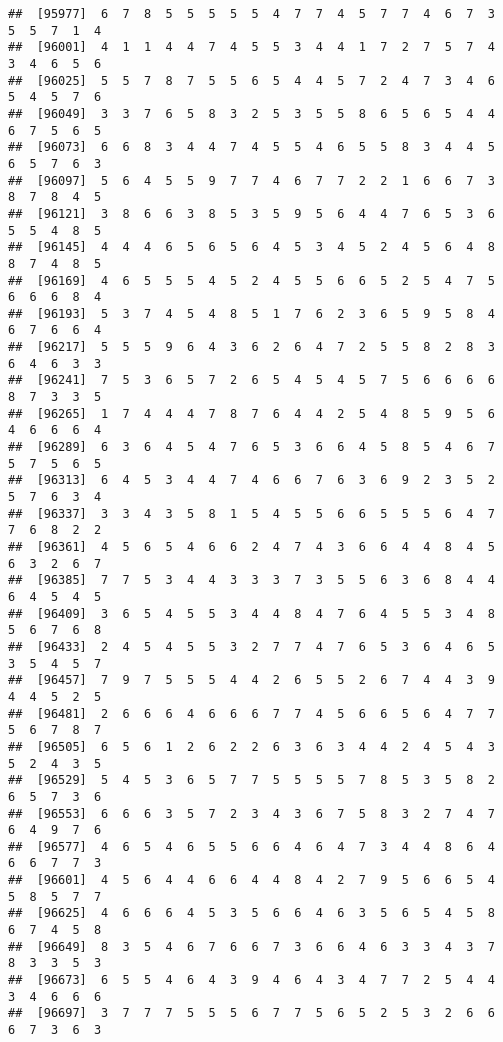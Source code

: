 \documentclass[
]{book}
\begin{document}
\begin{verbatim}
##  [95977]  6  7  8  5  5  5  5  5  4  7  7  4  5  7  7  4  6  7  3  5  5  7  1  4
##  [96001]  4  1  1  4  4  7  4  5  5  3  4  4  1  7  2  7  5  7  4  3  4  6  5  6
##  [96025]  5  5  7  8  7  5  5  6  5  4  4  5  7  2  4  7  3  4  6  5  4  5  7  6
##  [96049]  3  3  7  6  5  8  3  2  5  3  5  5  8  6  5  6  5  4  4  6  7  5  6  5
##  [96073]  6  6  8  3  4  4  7  4  5  5  4  6  5  5  8  3  4  4  5  6  5  7  6  3
##  [96097]  5  6  4  5  5  9  7  7  4  6  7  7  2  2  1  6  6  7  3  8  7  8  4  5
##  [96121]  3  8  6  6  3  8  5  3  5  9  5  6  4  4  7  6  5  3  6  5  5  4  8  5
##  [96145]  4  4  4  6  5  6  5  6  4  5  3  4  5  2  4  5  6  4  8  8  7  4  8  5
##  [96169]  4  6  5  5  5  4  5  2  4  5  5  6  6  5  2  5  4  7  5  6  6  6  8  4
##  [96193]  5  3  7  4  5  4  8  5  1  7  6  2  3  6  5  9  5  8  4  6  7  6  6  4
##  [96217]  5  5  5  9  6  4  3  6  2  6  4  7  2  5  5  8  2  8  3  6  4  6  3  3
##  [96241]  7  5  3  6  5  7  2  6  5  4  5  4  5  7  5  6  6  6  6  8  7  3  3  5
##  [96265]  1  7  4  4  4  7  8  7  6  4  4  2  5  4  8  5  9  5  6  4  6  6  6  4
##  [96289]  6  3  6  4  5  4  7  6  5  3  6  6  4  5  8  5  4  6  7  5  7  5  6  5
##  [96313]  6  4  5  3  4  4  7  4  6  6  7  6  3  6  9  2  3  5  2  5  7  6  3  4
##  [96337]  3  3  4  3  5  8  1  5  4  5  5  6  6  5  5  5  6  4  7  7  6  8  2  2
##  [96361]  4  5  6  5  4  6  6  2  4  7  4  3  6  6  4  4  8  4  5  6  3  2  6  7
##  [96385]  7  7  5  3  4  4  3  3  3  7  3  5  5  6  3  6  8  4  4  6  4  5  4  5
##  [96409]  3  6  5  4  5  5  3  4  4  8  4  7  6  4  5  5  3  4  8  5  6  7  6  8
##  [96433]  2  4  5  4  5  5  3  2  7  7  4  7  6  5  3  6  4  6  5  3  5  4  5  7
##  [96457]  7  9  7  5  5  5  4  4  2  6  5  5  2  6  7  4  4  3  9  4  4  5  2  5
##  [96481]  2  6  6  6  4  6  6  6  7  7  4  5  6  6  5  6  4  7  7  5  6  7  8  7
##  [96505]  6  5  6  1  2  6  2  2  6  3  6  3  4  4  2  4  5  4  3  5  2  4  3  5
##  [96529]  5  4  5  3  6  5  7  7  5  5  5  5  7  8  5  3  5  8  2  6  5  7  3  6
##  [96553]  6  6  6  3  5  7  2  3  4  3  6  7  5  8  3  2  7  4  7  6  4  9  7  6
##  [96577]  4  6  5  4  6  5  5  6  6  4  6  4  7  3  4  4  8  6  4  6  6  7  7  3
##  [96601]  4  5  6  4  4  6  6  4  4  8  4  2  7  9  5  6  6  5  4  5  8  5  7  7
##  [96625]  4  6  6  6  4  5  3  5  6  6  4  6  3  5  6  5  4  5  8  6  7  4  5  8
##  [96649]  8  3  5  4  6  7  6  6  7  3  6  6  4  6  3  3  4  3  7  8  3  3  5  3
##  [96673]  6  5  5  4  6  4  3  9  4  6  4  3  4  7  7  2  5  4  4  3  4  6  6  6
##  [96697]  3  7  7  7  5  5  5  6  7  7  5  6  5  2  5  3  2  6  6  6  7  3  6  3

\end{verbatim}
\end{document}
